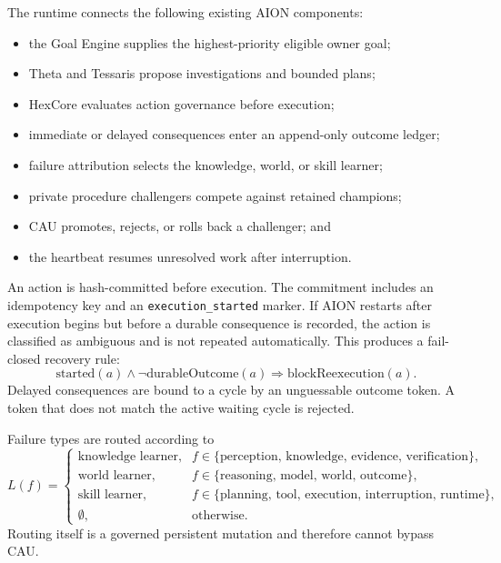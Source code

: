 The runtime connects the following existing AION components:
\begin{itemize}
    \item the Goal Engine supplies the highest-priority eligible owner goal;
    \item Theta and Tessaris propose investigations and bounded plans;
    \item HexCore evaluates action governance before execution;
    \item immediate or delayed consequences enter an append-only outcome ledger;
    \item failure attribution selects the knowledge, world, or skill learner;
    \item private procedure challengers compete against retained champions;
    \item CAU promotes, rejects, or rolls back a challenger; and
    \item the heartbeat resumes unresolved work after interruption.
\end{itemize}

An action is hash-committed before execution.  The commitment includes an
idempotency key and an \texttt{execution\_started} marker.  If AION restarts
after execution begins but before a durable consequence is recorded, the action
is classified as ambiguous and is not repeated automatically.  This produces a
fail-closed recovery rule:
\begin{equation}
\text{started}(a) \land \neg\text{durableOutcome}(a)
\Longrightarrow \text{blockReexecution}(a).
\end{equation}
Delayed consequences are bound to a cycle by an unguessable outcome token.  A
token that does not match the active waiting cycle is rejected.

Failure types are routed according to
\begin{equation}
L(f)=
\begin{cases}
\text{knowledge learner}, & f\in\{\text{perception, knowledge, evidence, verification}\},\\
\text{world learner}, & f\in\{\text{reasoning, model, world, outcome}\},\\
\text{skill learner}, & f\in\{\text{planning, tool, execution, interruption, runtime}\},\\
\emptyset, & \text{otherwise}.
\end{cases}
\label{eq:failure-routing}
\end{equation}
Routing itself is a governed persistent mutation and therefore cannot bypass
CAU.

